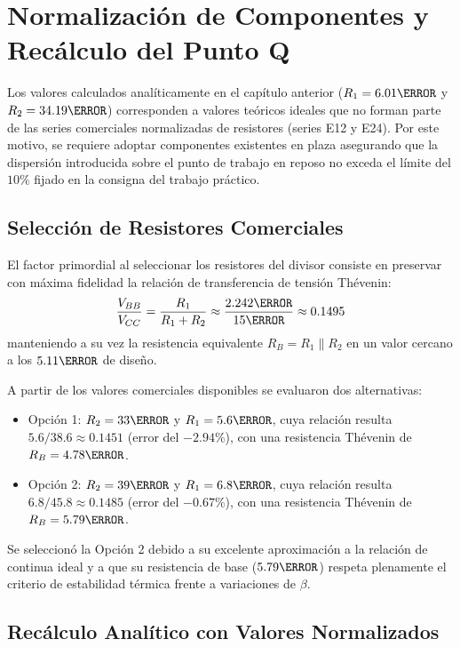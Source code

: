 \chapter{Normalización de Componentes y Recálculo del Punto Q}
\label{chap:normalizacion}

Los valores calculados analíticamente en el capítulo anterior ($R_1 = 6.01\kohm$ y $R_2 = 34.19\kohm$) corresponden
a valores teóricos ideales que no forman parte de las series comerciales normalizadas de resistores (series E12 y E24).
Por este motivo, se requiere adoptar componentes existentes en plaza asegurando que la dispersión introducida sobre
el punto de trabajo en reposo no exceda el límite del $10\%$ fijado en la consigna del trabajo práctico.

\section{Selección de Resistores Comerciales}

El factor primordial al seleccionar los resistores del divisor consiste en preservar con máxima fidelidad la relación
de transferencia de tensión Thévenin:
\begin{equation}
  \frac{V_{BB}}{V_{CC}} = \frac{R_1}{R_1 + R_2} \approx \frac{2.242\V}{15\V} \approx 0.1495
\end{equation}
manteniendo a su vez la resistencia equivalente $R_B = R_1 \parallel R_2$ en un valor cercano a los $5.11\kohm$ de diseño.

A partir de los valores comerciales disponibles se evaluaron dos alternativas:
\begin{itemize}
  \item Opción 1: $R_2 = 33\kohm$ y $R_1 = 5.6\kohm$, cuya relación resulta $5.6 / 38.6 \approx 0.1451$ (error del $-2.94\%$),
    con una resistencia Thévenin de $R_B = 4.78\kohm$.
  \item Opción 2: $R_2 = 39\kohm$ y $R_1 = 6.8\kohm$, cuya relación resulta $6.8 / 45.8 \approx 0.1485$ (error del $-0.67\%$),
    con una resistencia Thévenin de $R_B = 5.79\kohm$.
\end{itemize}

Se seleccionó la Opción 2 debido a su excelente aproximación a la relación de continua ideal y a que su resistencia de
base ($5.79\kohm$) respeta plenamente el criterio de estabilidad térmica frente a variaciones de $\beta$.

\section{Recálculo Analítico con Valores Normalizados}

